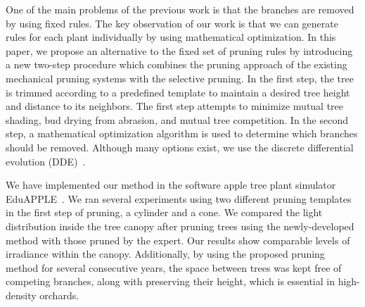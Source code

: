 One of the main problems of the previous work is that the branches are
removed by using fixed rules. The key observation of our work is
that we can generate rules for each plant individually by using mathematical optimization.
In this paper, we propose an alternative
to the fixed set of pruning rules by introducing a new two-step
procedure which combines the pruning approach of the existing mechanical
pruning systems with the selective pruning. In the first step, the tree
is trimmed according to a predefined template to maintain a desired
tree height and distance to its neighbors. The first step attempts to minimize mutual tree shading, bud drying from abrasion, and mutual tree competition.
In the second step, a mathematical optimization algorithm is used to determine which branches should be removed. Although many options exist, we use 
the discrete differential evolution (DDE)~\cite{strnad_novel_2017}. 

We have implemented our method in the software apple tree plant simulator EduAPPLE~\cite{kohek_eduapple:_2015}. We ran several experiments using two different pruning templates in the first
step of pruning, a cylinder and a cone. 
We compared the light distribution inside the tree canopy after pruning trees using the
newly-developed method with those pruned by the expert.
Our results show comparable levels of irradiance within the canopy.
Additionally, by using the proposed pruning method for several consecutive
years, the space between trees was kept free of competing branches, along with preserving their height, which is essential in high-density orchards.
